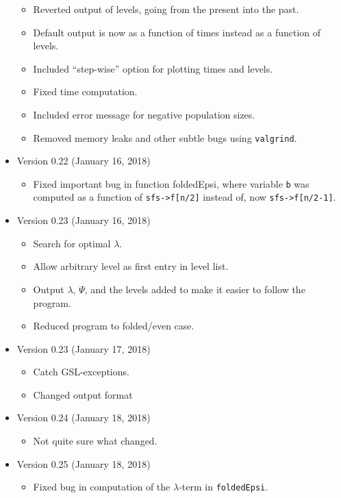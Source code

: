 \documentclass[a4paper, english]{article}
\newcommand{\ty}{\texttt}
\begin{document}
\begin{itemize}
\begin{itemize}
    \item Reverted output of levels, going from the present into the
      past.
    \item Default output is now as a function of times instead as a
      function of levels.
    \item Included ``step-wise'' option for plotting times and levels.
    \item Fixed time computation.
    \item Included error message for negative population sizes.
    \item Removed memory leaks and other subtle bugs using \ty{valgrind}.
  \end{itemize}
\item Version 0.22 (January 16, 2018)
  \begin{itemize}
    \item Fixed important bug in function foldedEpsi, where variable
      \ty{b} was computed as a function of \verb+sfs->f[n/2]+ instead
      of, now \verb+sfs->f[n/2-1]+.
  \end{itemize}
\item Version 0.23 (January 16, 2018)
  \begin{itemize}
  \item Search for optimal $\lambda$.
  \item Allow arbitrary level as first entry in level list.
  \item Output $\lambda$, $\Psi$, and the levels added to make it
    easier to follow the program.
  \item Reduced program to folded/even case.
  \end{itemize}
\item Version 0.23 (January 17, 2018)
  \begin{itemize}
  \item Catch GSL-exceptions.
  \item Changed output format
  \end{itemize}
\item Version 0.24 (January 18, 2018)
  \begin{itemize}
  \item Not quite sure what changed.
  \end{itemize}
\item Version 0.25 (January 18, 2018)
  \begin{itemize}
  \item Fixed bug in computation of the $\lambda$-term in
    \ty{foldedEpsi}.
  \end{itemize}

\end{itemize}
\end{document}
